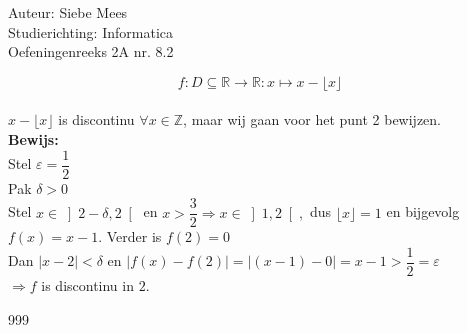 \documentclass[a4paper]{article}
\begin{document}
  
\noindent \large Auteur: Siebe Mees \\
\noindent \large Studierichting: Informatica\\
\noindent \large Oefeningenreeks 2A nr. 8.2\\

\medskip

\normalsize

$$f: D \subseteq \mathbb{R} \to \mathbb{R} : x \mapsto x - \lfloor x \rfloor$$\\

$x - \lfloor x \rfloor$ is discontinu  $\forall x \in \mathbb{Z}$, maar wij gaan voor het punt 2 bewijzen.\\

\textbf{Bewijs:}\\

Stel $\varepsilon = \dfrac{1}{2}$\\

Pak $\delta>0$\\

Stel $x \in \left]2 - \delta, 2\right[ $ en $ x > \dfrac{3}{2} \Rightarrow x \in \left]1, 2\right[, $ dus $ \lfloor x \rfloor = 1 $ en bijgevolg $ f(x) = x - 1. $ Verder is $ f(2) = 0 $\\

Dan $\left|x-2\right|<\delta$ en $\left| f(x)-f(2) \right| = |(x-1)-0|=x-1>\dfrac{1}{2}=\varepsilon $\\

$ \Rightarrow f$ is discontinu in $2$. \\


\begin{thebibliography}{999}

\end{thebibliography}
\end{document}
